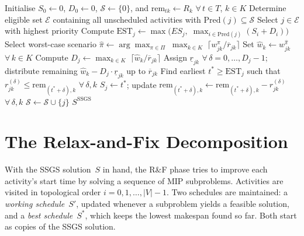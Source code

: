 \begin{algorithm}[ht]
\caption{Procedure of the proposed serial schedule generation scheme}
\label{alg:ssgs}
\begin{algorithmic}[1]
\State Initialise $S_0 \leftarrow 0$, $D_0 \leftarrow 0$,
       $\mathcal{S} \leftarrow \{0\}$, and
       $\mathrm{rem}_{tk} \leftarrow R_k$ $\forall\, t \in T$,
       $k \in K$
    \State Determine eligible set $\mathcal{E}$ containing all
           unscheduled activities with
           $\mathrm{Pred}(j) \subseteq \mathcal{S}$
    \State Select $j \in \mathcal{E}$ with highest priority
    \State Compute $\mathrm{EST}_j \leftarrow
           \max\bigl(ES_j,\;
           \max_{i \in \mathrm{Pred}(j)} (S_i + D_i)\bigr)$
    \State Select worst-case scenario
           $\hat{\pi} \leftarrow \arg\max_{\pi \in \Pi}\;
           \max_{k \in K}\;
           \lceil w_{jk}^{\pi} / \overline{r}_{jk} \rceil$
    \State Set $\hat{w}_k \leftarrow w_{jk}^{\hat{\pi}}$
           $\forall\, k \in K$
    \State Compute $D_j \leftarrow \max_{k \in K}\;
           \lceil \hat{w}_k / \overline{r}_{jk} \rceil$
        \State Assign $\underline{r}_{jk}$ $\forall\,
               \delta = 0, \ldots, D_j\!-\!1$; distribute
               remaining $\hat{w}_k - D_j \cdot
               \underline{r}_{jk}$ up to $\overline{r}_{jk}$
    \EndFor
    \State Find earliest $t^* \geq \mathrm{EST}_j$ such that
           $r_{jk}^{(\delta)} \leq
           \mathrm{rem}_{(t^*\!+\delta),k}$
           $\forall\, \delta, k$
    \State $S_j \leftarrow t^*$; update
           $\mathrm{rem}_{(t^*\!+\delta),k} \leftarrow
           \mathrm{rem}_{(t^*\!+\delta),k} -
           r_{jk}^{(\delta)}$ $\forall\, \delta, k$
    \State $\mathcal{S} \leftarrow \mathcal{S} \cup \{j\}$
\EndWhile
\State \Return $S^{\mathrm{SSGS}}$
\end{algorithmic}
\end{algorithm}
\section{The Relax-and-Fix Decomposition}
\label{sec:baseline_rf}
With the SSGS solution~$S$ in hand, the R\&F phase tries to
improve each activity's start time by solving a sequence of MIP
subproblems. Activities are visited in topological order
$i = 0, 1, \ldots, |V|-1$. Two schedules are maintained: a
\textit{working schedule}~$S'$, updated whenever a subproblem
yields a feasible solution, and a \textit{best schedule}~$S^*$,
which keeps the lowest makespan found so far. Both start as copies
of the SSGS solution.

